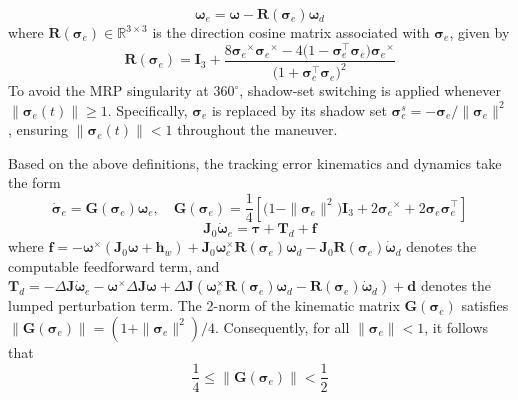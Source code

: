 \documentclass[journal]{new-aiaa}
\begin{document}
\begin{equation}
\boldsymbol{\omega}_e = \boldsymbol{\omega} - \boldsymbol{R}(\boldsymbol{\sigma}_e)\boldsymbol{\omega}_d
\label{eq:angular_velocity_error_definition}
\end{equation}
where $\boldsymbol{R}(\boldsymbol{\sigma}_e) \in \mathbb{R}^{3\times 3}$ is the direction cosine matrix associated with $\boldsymbol{\sigma}_e$, given by
\begin{equation}
\boldsymbol{R}(\boldsymbol{\sigma}_e) = \boldsymbol{I}_3 + \frac{8 {\boldsymbol{\sigma}_e}^{\times} 
{\boldsymbol{\sigma}_e}^{\times} - 4 \big(1 - \boldsymbol{\sigma}_e^\top \boldsymbol{\sigma}_e\big) 
{\boldsymbol{\sigma}_e}^{\times} }{\big(1 + \boldsymbol{\sigma}_e^\top \boldsymbol{\sigma}_e\big)^2}
\label{eq:R_sigma_e_definition}
\end{equation}
To avoid the MRP singularity at $360^\circ$, shadow-set switching is applied whenever $\|\boldsymbol{\sigma}_e(t)\|\ge 1$. 
Specifically, $\boldsymbol{\sigma}_e$ is replaced by its shadow set $\boldsymbol{\sigma}_e^s = -\boldsymbol{\sigma}_e/\|\boldsymbol{\sigma}_e\|^2$, 
ensuring $\|\boldsymbol{\sigma}_e(t)\|<1$ throughout the maneuver.

Based on the above definitions, the tracking error kinematics and dynamics take the form
\begin{equation}
\dot{\boldsymbol{\sigma}}_e = \boldsymbol{G}(\boldsymbol{\sigma}_e)\boldsymbol{\omega}_e , \quad
\boldsymbol{G}(\boldsymbol{\sigma}_e) = \frac{1}{4} \left[ \big(1 - \|\boldsymbol{\sigma}_e\|^2\big) \boldsymbol{I}_3 + 2 {\boldsymbol{\sigma}_e}^{\times} + 2 \boldsymbol{\sigma}_e \boldsymbol{\sigma}_e^\top \right]
\label{eq:mrp_error_kinematics}
\end{equation}
\begin{equation}
\boldsymbol{J}_0 \dot{\boldsymbol{\omega}}_e = \boldsymbol{\tau} + \boldsymbol{T}_d + \boldsymbol{f}
\label{eq:simplified_error_dynamics}
\end{equation}
where
$\boldsymbol{f} = - \boldsymbol{\omega}^{\times} (\boldsymbol{J}_0 \boldsymbol{\omega} + \boldsymbol{h}_w)+
\boldsymbol{J}_0 \boldsymbol{\omega}_e^{\times} \boldsymbol{R}(\boldsymbol{\sigma}_e)\boldsymbol{\omega}_d-
\boldsymbol{J}_0 \boldsymbol{R}(\boldsymbol{\sigma}_e)\dot{\boldsymbol{\omega}}_d$
denotes the computable feedforward term, and
$\boldsymbol{T}_d = -\Delta \boldsymbol{J} \dot{\boldsymbol{\omega}}_e - \boldsymbol{\omega}^\times \Delta \boldsymbol{J} 
\boldsymbol{\omega} + \Delta \boldsymbol{J} (\boldsymbol{\omega}_e^\times \boldsymbol{R}(\boldsymbol{\sigma}_e) 
\boldsymbol{\omega}_d - \boldsymbol{R}(\boldsymbol{\sigma}_e) \dot{\boldsymbol{\omega}}_d) + \boldsymbol{d}$ 
denotes the lumped perturbation term.
The 2-norm of the kinematic matrix $\boldsymbol{G}(\boldsymbol{\sigma}_e)$ satisfies
$\|\boldsymbol{G}(\boldsymbol{\sigma}_e)\| = (1 + \|\boldsymbol{\sigma}_e\|^2)/4$.
Consequently, for all $\|\boldsymbol{\sigma}_e\| < 1$, it follows that
\begin{equation}
\frac{1}{4} \le \|\boldsymbol{G}(\boldsymbol{\sigma}_e)\| < \frac{1}{2}
\label{eq:G_norm_bound}
\end{equation}
\end{document}
